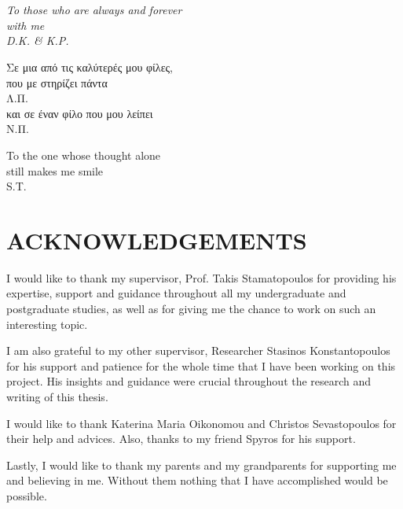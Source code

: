 \documentclass[12pt,a4paper,table,dvipsnames,tikz]{report}
\begin{document}
	
	\chapter*{}
	\thispagestyle{empty}
	\begin{flushright}
	\itshape
	To those who are always and forever\\
	with me\\
	D.K. \& K.P.\\
	\vspace{4cm}
	
	Σε μια από τις καλύτερές μου φίλες,\\
	που με στηρίζει πάντα\\
	Λ.Π.\\
	\vspace{0.5cm}
	και σε έναν φίλο που μου λείπει\\
	Ν.Π.\\
	\vspace{4cm}
	
	To the one whose thought alone\\
	still makes me smile\\
	S.T.
	\end{flushright}
	
	\chapter*{ACKNOWLEDGEMENTS}
	\thispagestyle{empty}
	I would like to thank my supervisor, Prof. Takis Stamatopoulos for providing his 
	expertise, support and guidance throughout all my undergraduate and postgraduate 
	studies, as well as for giving me the chance to work on such an interesting topic.
	\par
	I am also grateful to my other supervisor, Researcher Stasinos Konstantopoulos 
	for his support and patience for the whole time that I have been working 
	on this project. His insights and guidance were crucial throughout the research 
	and writing of this thesis.
	\par
	I would like to thank Katerina Maria Oikonomou and Christos Sevastopoulos for 
	their help and advices. Also, thanks to my friend Spyros for his support. 
	\par
	Lastly, I would like to thank my parents and my grandparents for supporting me and 
	believing in me. Without them nothing that I have accomplished would be possible.
	
\end{document}
